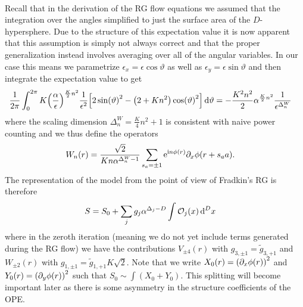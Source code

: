 \documentclass[english, parskip=full]{scrartcl}
\begin{document}
\\
Recall that in the derivation of the RG flow equations we assumed that the integration over the angles simplified to just the surface area of the $D$-hypersphere.
Due to the structure of this expectation value it is now apparent that this assumption is simply not always correct and that the proper generalization instead involves averaging over all of the angular variables.
In our case this means we parametrize $\epsilon_x = \epsilon \cos\vartheta$ as well as $\epsilon_y=\epsilon\sin\vartheta$ and then integrate the expectation value to get
\begin{align}
\frac{1}{2\pi} \intx{0}{2\pi}{ K \kla*{\frac{\alpha}{\epsilon}}^{\frac{K}{2}n^2} \frac{1}{\epsilon^2} \klb*{2\sin(\vartheta)^2 - \kla*{2+Kn^2} \cos(\vartheta)^2} }{\vartheta} &= -\frac{K^2n^2}{2} \alpha^{\frac{K}{2}n^2} \frac{1}{\epsilon^{\Delta^W_n}}
\end{align}
where the scaling dimension $\Delta^W_n = \frac{K}{4}n^2+1$ is consistent with naive power counting and we thus define the operators
\begin{align}
W_n(r) &= \frac{\sqrt{2}}{Kn \alpha^{\Delta^W_n-1}} \sum_{s_a=\pm 1} \powe{\i n\phi(r)} \partial_x\phi(r+s_aa).
\end{align}
The representation of the model from the point of view of Fradkin's RG is therefore
\begin{align}
S &= S_0 + \sum_j g_j \alpha^{\Delta_j-D} \int \mathcal{O}_j(x) \,\d^Dx
\end{align}
where in the zeroth iteration (meaning we do not yet include terms generated during the RG flow) we have the contributions $V_{\pm 4}(r)$ with $g_{3, \pm 1} = \tilde{g}_{3,+ 1}$ and $W_{\pm 2}(r)$ with $g_{1,\pm 1} = \tilde{g}_{1,+1} K \sqrt{2} $.
Note that we write $X_0(r) = \kla*{\partial_x\phi(r)}^2$ and $Y_0(r) = \kla*{\partial_y\phi(r)}^2$ such that $S_0 \sim \int (X_0 + Y_0)$.
This splitting will become important later as there is some asymmetry in the structure coefficients of the OPE.
\end{document}
